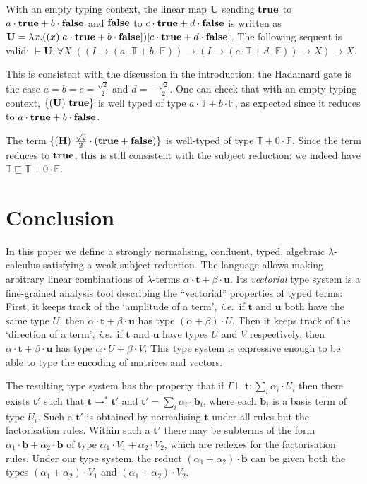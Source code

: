 \documentclass[colorlinks=true,linkcolor=black,urlcolor=black,citecolor=blue,submission,copyright,creativecommons]{eptcs}
\newcommand{\canon}[1]{[#1]}
\newcommand{\cocanon}[1]{\{#1\}}
\newcommand{\True}{\mathbb{T}}
\newcommand{\False}{\mathbb{F}}
\newcommand{\true}{{\bf true}}
\newcommand{\false}{{\bf false}}
\newcommand{\ie}{\emph{i.e.}~}
\newcommand{\ve}[1]{\mathrm{\textbf{#1}}}
\newcommand{\type}{\colon\!}
\begin{document}
With an empty typing context, the linear map $\ve{U}$ sending $\true$
to $a\cdot\true+b\cdot\false$ and $\false$ to
$c\cdot\true+d\cdot\false$ is written as
$\ve U={\lambda x.((x)\canon{a\cdot\true+b\cdot\false})\canon{c\cdot\true+d\cdot\false}}$.
The following sequent is valid: 
$\vdash\ve{U}:\forall X.((I\to
(a\cdot\True+b\cdot\False))\to(I\to (c\cdot\True+d\cdot\False))\to
X)\to X$.

This is consistent with the discussion in the introduction:
the Hadamard gate is the case $a=b=c=\frac{\sqrt2}2$ and
$d=-\frac{\sqrt2}2$.  One can check that with an empty typing context,
$\cocanon{({\bf U})~\true}$ is well typed of type
$a\cdot\True+b\cdot\False$, as expected since it reduces to
$a\cdot\true+b\cdot\false$.

The term $\cocanon{({\bf H})~\frac{\sqrt2}2\cdot (\true+\false)}$ is
well-typed of type $\True+0\cdot\False$. Since the term reduces to
$\true$, this is still consistent with the subject reduction: we
indeed have
$\True\sqsubseteq\True+0\cdot\False$.


\section{Conclusion} \label{sec:conclusion}
In this paper we define a strongly normalising, confluent,
typed,
algebraic $\lambda$-calculus satisfying a weak subject reduction. The
language allows making arbitrary linear combinations of
$\lambda$-terms $\alpha\cdot \ve{t}+\beta\cdot \ve{u}$. Its {\em
  vectorial} type system is a fine-grained analysis tool describing the
``vectorial'' properties of typed terms: First, it keeps track of the
`amplitude of a term', \ie if $\ve{t}$ and $\ve{u}$ both have the same
type $U$, then $\alpha\cdot \ve{t}+\beta\cdot \ve{u}$ has type
$(\alpha+\beta)\cdot U$. Then it keeps track of the `direction of a
term', \ie if $\ve{t}$ and $\ve{u}$ have types $U$ and $V$
respectively, then $\alpha\cdot \ve{t}+\beta\cdot \ve{u}$ has type
$\alpha\cdot U+\beta\cdot V$. This type system is expressive enough to be able to
type the encoding of matrices and vectors.

The resulting type system has the property that if $\Gamma\vdash\ve
t\type\sum_i\alpha_i\cdot U_i$ then there exists $\ve t'$ such that
$\ve t\to^*\ve t'$ and $\ve t'=\sum_i\alpha_i{\cdot}\ve b_i$, where
each $\ve b_i$ is a basis term of type $U_i$. Such a $\ve t'$ is
obtained by normalising $\ve t$ under all rules but the factorisation
rules. Within such a $\ve t'$ there may be subterms of the form
$\alpha_1{\cdot}\ve b+\alpha_2{\cdot}\ve b$ of type
$\alpha_1{\cdot}V_1+\alpha_2{\cdot}V_2$, which are redexes for the
factorisation rules. Under our type system, the reduct
$(\alpha_1+\alpha_2){\cdot}\ve b$ can be given both the types
$(\alpha_1+\alpha_2){\cdot}V_1$ and $(\alpha_1+\alpha_2){\cdot}V_2$.
\end{document}
